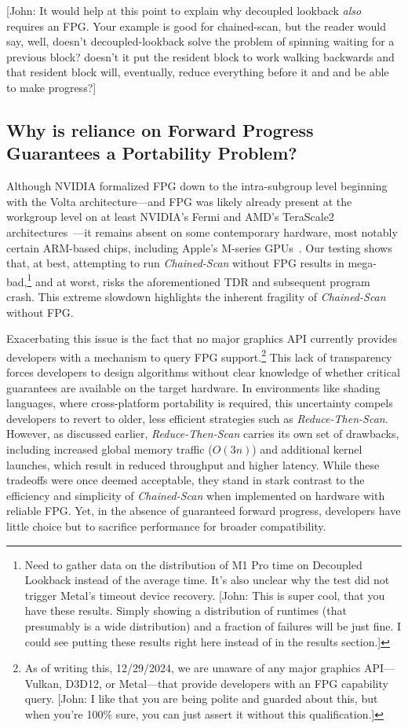 \documentclass[sigconf]{acmart}
\newcommand{\john}[1]{{\footnotesize\color{cyan}[John: #1]}}
\begin{document}
\john{It would help at this point to explain why decoupled lookback \emph{also} requires an FPG\@. Your example is good for chained-scan, but the reader would say, well, doesn't decoupled-lookback solve the problem of spinning waiting for a previous block? doesn't it put the resident block to work walking backwards and that resident block will, eventually, reduce everything before it and and be able to make progress?}

\subsection{Why is reliance on Forward Progress Guarantees a Portability Problem?}
Although NVIDIA formalized FPG down to the intra-subgroup level beginning with the Volta architecture---and FPG was likely already present at the workgroup level on at least NVIDIA's Fermi and AMD's TeraScale2 architectures~\cite{}---it remains absent on some contemporary hardware, most notably certain ARM-based chips, including Apple's M-series GPUs~\cite{10.1145/3485508}. Our testing shows that, at best, attempting to run \emph{Chained-Scan} without FPG results in mega-bad,\footnote{Need to gather data on the distribution of M1 Pro time on Decoupled Lookback instead of the average time. It's also unclear why the test did not trigger Metal's timeout device recovery. \john{This is super cool, that you have these results. Simply showing a distribution of runtimes (that presumably is a wide distribution) and a fraction of failures will be just fine. I could see putting these results right here instead of in the results section.}} and at worst, risks the aforementioned TDR and subsequent program crash. This extreme slowdown highlights the inherent fragility of \emph{Chained-Scan} without FPG\@.

Exacerbating this issue is the fact that no major graphics API currently provides developers with a mechanism to query FPG support.\footnote{As of writing this, 12/29/2024, we are unaware of any major graphics API---Vulkan, D3D12, or Metal---that provide developers with an FPG capability query. \john{I like that you are being polite and guarded about this, but when you're 100\% sure, you can just assert it without this qualification.}} This lack of transparency forces developers to design algorithms without clear knowledge of whether critical guarantees are available on the target hardware. In environments like shading languages, where cross-platform portability is required, this uncertainty compels developers to revert to older, less efficient strategies such as \emph{Reduce-Then-Scan}. However, as discussed earlier, \emph{Reduce-Then-Scan} carries its own set of drawbacks, including increased global memory traffic ($O(3n)$) and additional kernel launches, which result in reduced throughput and higher latency. While these tradeoffs were once deemed acceptable, they stand in stark contrast to the efficiency and simplicity of \emph{Chained-Scan} when implemented on hardware with reliable FPG\@. Yet, in the absence of guaranteed forward progress, developers have little choice but to sacrifice performance for broader compatibility.
\end{document}
